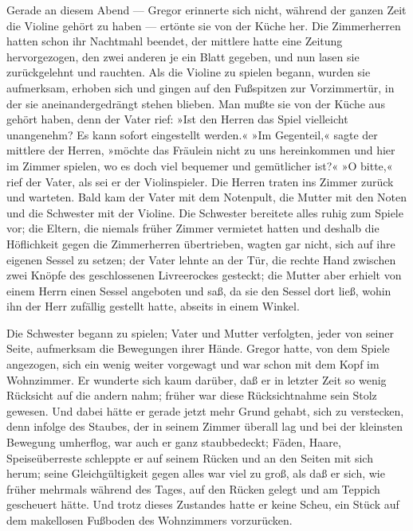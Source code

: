 Gerade an diesem Abend --- Gregor erinnerte sich nicht, während der
ganzen Zeit die Violine gehört zu haben --- ertönte sie von der Küche
her. Die Zimmerherren hatten schon ihr Nachtmahl beendet, der mittlere
hatte eine Zeitung hervorgezogen, den zwei anderen je ein Blatt gegeben,
und nun lasen sie zurückgelehnt und rauchten. Als die Violine zu spielen
begann, wurden sie aufmerksam, erhoben sich und gingen auf den
Fußspitzen zur Vorzimmertür, in der sie aneinandergedrängt stehen
blieben. Man mußte sie von der Küche aus gehört haben, denn der Vater
rief: »Ist den Herren das Spiel vielleicht unangenehm? Es kann sofort
eingestellt werden.« »Im Gegenteil,« sagte der mittlere der Herren,
»möchte das Fräulein nicht zu uns hereinkommen und hier im Zimmer
spielen, wo es doch viel bequemer und gemütlicher ist?« »O bitte,« rief
der Vater, als sei er der Violinspieler. Die Herren traten ins Zimmer
zurück und warteten. Bald kam der Vater mit dem Notenpult, die Mutter
mit den Noten und die Schwester mit der Violine. Die Schwester bereitete
alles ruhig zum Spiele vor; die Eltern, die niemals früher Zimmer
vermietet hatten und deshalb die Höflichkeit gegen die Zimmerherren
übertrieben, wagten gar nicht, sich auf ihre eigenen Sessel zu setzen;
der Vater lehnte an der Tür, die rechte Hand zwischen zwei Knöpfe des
geschlossenen Livreerockes gesteckt; die Mutter aber erhielt von einem
Herrn einen Sessel angeboten und saß, da sie den Sessel dort ließ, wohin
ihn der Herr zufällig gestellt hatte, abseits in einem Winkel.

Die Schwester begann zu spielen; Vater und Mutter verfolgten, jeder von
seiner Seite, aufmerksam die Bewegungen ihrer Hände. Gregor hatte, von
dem Spiele angezogen, sich ein wenig weiter vorgewagt und war schon mit
dem Kopf im Wohnzimmer. Er wunderte sich kaum darüber, daß er in letzter
Zeit so wenig Rücksicht auf die andern nahm; früher war diese
Rücksichtnahme sein Stolz gewesen. Und dabei hätte er gerade jetzt mehr
Grund gehabt, sich zu verstecken, denn infolge des Staubes, der in
seinem Zimmer überall lag und bei der kleinsten Bewegung umherflog, war
auch er ganz staubbedeckt; Fäden, Haare, Speiseüberreste schleppte er
auf seinem Rücken und an den Seiten mit sich herum; seine
Gleichgültigkeit gegen alles war viel zu groß, als daß er sich, wie
früher mehrmals während des Tages, auf den Rücken gelegt und am Teppich
gescheuert hätte. Und trotz dieses Zustandes hatte er keine Scheu, ein
Stück auf dem makellosen Fußboden des Wohnzimmers vorzurücken.

